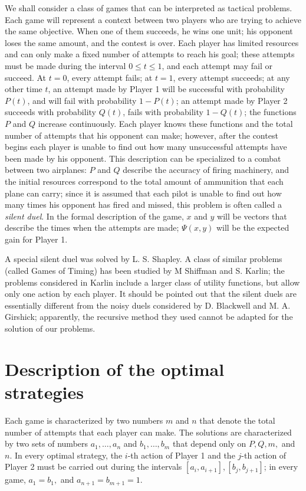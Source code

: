 \documentclass{article}
\theoremstyle{remark}
\begin{document}
We shall consider a class of games that can be interpreted as tactical
problems. Each game will represent a context between two players who are trying
to achieve the same objective. When one of them succeeds, he wins one unit; his
opponent loses the same amount, and the contest is over. Each player has
limited resources and can only make a fixed number of attempts to reach his
goal; these attempts must be made during the interval $0 \leq t \leq 1$, and
each attempt may fail or succeed. At $t=0$, every attempt fails; at $t=1$,
every attempt succeeds; at any other time $t$, an attempt made by Player 1 will
be successful with probability $P(t)$, and will fail with probability $1 -
P(t)$; an attempt made by Player 2 succeeds with probability $Q(t)$, fails with
probability $1- Q(t)$; the functions $P$ and $Q$ increase continuously. Each
player knows these functions and the total number of attempts that his opponent
can make; however, after the contest begins each player is unable to find out
how many unsuccessful attempts have been made by his opponent. This description
can be specialized to a combat between two airplanes: $P$ and $Q$ describe the
accuracy of firing machinery, and the initial resources correspond to the total
amount of ammunition that each plane can carry; since it is assumed that each
pilot is unable to find out how many times his opponent has fired and missed,
this problem is often called a \emph{silent duel}. In the formal description of
the game, $x$ and $y$ will be vectors that describe the times when the attempts
are made; $\Psi(x, y)$ will be the expected gain for Player 1.

A special silent duel was solved by L. S. Shapley. A class of similar problems
(called Games of Timing) has been studied by M Shiffman and S. Karlin; the
problems considered in Karlin include a larger class of utility functions, but
allow only one action by each player. It should be pointed out that the silent
duels are essentially different from the noisy duels considered by D. Blackwell
and M. A. Girshick; apparently, the recursive method they used cannot be
adapted for the solution of our problems.

\section{Description of the optimal strategies}

Each game is characterized by two numbers $m$ and $n$ that denote the total
number of attempts that each player can make. The solutions are characterized
by two sets of numbers $a_1, \dots, a_n$ and $b_1, \dots, b_m$ that depend only
on $P, Q, m,$ and $n$. In every optimal strategy, the $i$-th action of Player
1 and the $j$-th action of Player 2 must be carried out during the intervals
$[a_i, a_{i+1}], [b_j, b_{j+1}]$; in every game, $a_1 = b_1,$ and $a_{n+1} =
b_{m+1} = 1$.
\end{document}
